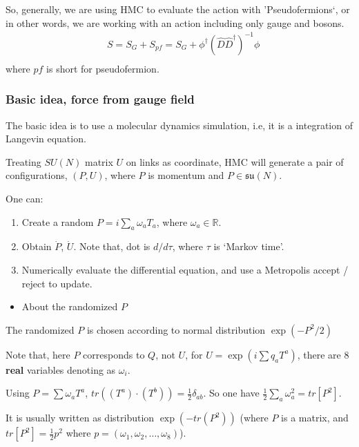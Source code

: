 So, generally, we are using HMC to evaluate the action with 'Pseudofermions`, or in other words, we are working with an action including only gauge and bosons.
\begin{equation}
\begin{split}
&S=S_G+S_{pf}=S_G+\phi ^{\dagger}\left(\hat{D}\hat{D}^{\dagger}\right)^{-1} \phi\\
\end{split}
\end{equation}
where $pf$ is short for pseudofermion.

\subsubsection{\label{hmc_scheme}Basic idea, force from gauge field}

The basic idea is to use a molecular dynamics simulation, i.e, it is a integration of Langevin equation.

Treating $SU(N)$ matrix $U$ on links as coordinate, HMC will generate a pair of configurations, $(P,U)$, where $P$ is momentum and $P\in \mathfrak{su}(N)$.

One can:

\begin{enumerate}
  \item Create a random $P=i\sum _a\omega _a T_a$, where $\omega _a\in \mathbb{R}$.
  \item Obtain $\dot{P}$, $\dot{U}$. Note that, dot is $d/d\tau$, where $\tau$ is `Markov time'.
  \item Numerically evaluate the differential equation, and use a Metropolis accept / reject to update.
\end{enumerate}

\begin{itemize}
  \item About the randomized $P$
\end{itemize}

The randomized $P$ is chosen according to normal distribution $\exp \left(-P^2 /2\right)$

Note that, here $P$ corresponds to $Q$, not $U$, for $U=\exp\left(i \sum q_a T^a\right)$, there are $8$ \textbf{real} variables denoting as $\omega _i$.

Using $P=\sum \omega _a T^a$, $tr((T^a)\cdot (T^b))=\frac{1}{2}\delta _{ab}$. So one have $\frac{1}{2}\sum _a\omega _a^2=tr[P^2]$.

It is usually written as distribution $\exp \left(-tr(P^2)\right)$ (where $P$ is a matrix, and $tr[P^2]=\frac{1}{2}p^2$ where $p=(\omega_1,\omega_2,\ldots ,\omega _8)$).

